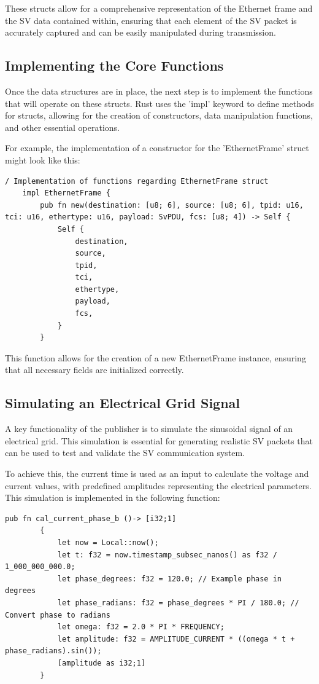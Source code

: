 These structs allow for a comprehensive representation of the Ethernet frame and the SV data contained within, ensuring that each element of the SV packet is accurately captured and can be easily manipulated during transmission.

\subsection{Implementing the Core Functions}

Once the data structures are in place, the next step is to implement the functions that will operate on these structs. Rust uses the 'impl' keyword to define methods for structs, allowing for the creation of constructors, data manipulation functions, and other essential operations.

For example, the implementation of a constructor for the 'EthernetFrame' struct might look like this:

\begin{lstlisting}[caption={How to implement an impl for the struct}]
	/ Implementation of functions regarding EthernetFrame struct
	impl EthernetFrame {
		pub fn new(destination: [u8; 6], source: [u8; 6], tpid: u16, tci: u16, ethertype: u16, payload: SvPDU, fcs: [u8; 4]) -> Self {
			Self {
				destination,
				source,
				tpid,
				tci,
				ethertype,
				payload,
				fcs,
			}
		}
	\end{lstlisting}
	
	This function allows for the creation of a new EthernetFrame instance, ensuring that all necessary fields are initialized correctly.
	
	\subsection{Simulating an Electrical Grid Signal}
	
	A key functionality of the publisher is to simulate the sinusoidal signal of an electrical grid. This simulation is essential for generating realistic SV packets that can be used to test and validate the SV communication system.
	
	To achieve this, the current time is used as an input to calculate the voltage and current values, with predefined amplitudes representing the electrical parameters. This simulation is implemented in the following function:
	
	\begin{lstlisting}[caption={How to calculate the value of the SV's }]
		pub fn cal_current_phase_b ()-> [i32;1]
		{
			let now = Local::now();
			let t: f32 = now.timestamp_subsec_nanos() as f32 / 1_000_000_000.0;
			let phase_degrees: f32 = 120.0; // Example phase in degrees
			let phase_radians: f32 = phase_degrees * PI / 180.0; // Convert phase to radians
			let omega: f32 = 2.0 * PI * FREQUENCY;
			let amplitude: f32 = AMPLITUDE_CURRENT * ((omega * t + phase_radians).sin());
			[amplitude as i32;1]
		}
	\end{lstlisting}
	
